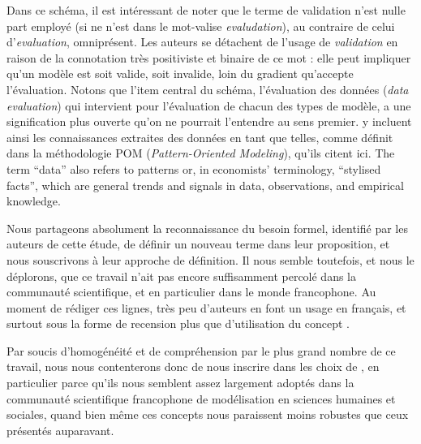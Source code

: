 Dans ce schéma, il est intéressant de noter que le terme de \og validation\fg{} n'est nulle part employé (si ne n'est dans le mot-valise \textit{evaludation}), au contraire de celui d'\og \textit{evaluation}\fg{}, omniprésent.
Les auteurs se détachent de l'usage de \og \textit{validation}\fg{} en raison de la connotation très positiviste et \og binaire\fg{} de ce mot : elle peut impliquer qu'un modèle est soit valide, soit invalide, loin du gradient qu'accepte l'évaluation.
Notons que l'item central du schéma, l'évaluation des données (\textit{data evaluation}) qui intervient pour l'évaluation de chacun des types de modèle, a une signification plus ouverte qu'on ne pourrait l'entendre au sens premier.
\textcite[121]{augusiak_merging_2014} y incluent ainsi les connaissances extraites des données en tant que telles, comme définit dans la méthodologie \og POM\fg{} (\textit{Pattern-Oriented Modeling}), qu'ils citent ici.
\og The term ``data'' also refers
to patterns \autocite{grimm_pattern-oriented_2012} or, in economists' terminology, ``stylised facts'', which are general trends and signals in data,
observations, and empirical knowledge.\fg{}

Nous partageons absolument la reconnaissance du besoin formel, identifié par les auteurs de cette étude, de définir un nouveau terme dans leur proposition, et nous souscrivons à leur approche de définition.
Il nous semble toutefois, et nous le déplorons, que ce travail n'ait pas encore suffisamment percolé dans la communauté scientifique, et en particulier dans le monde francophone.
Au moment de rédiger ces lignes, très peu d'auteurs en font un usage en français, et surtout sous la forme de recension plus que d'utilisation du concept \autocite[par exemple][89,436]{rey-coyrehourcq_plateforme_2015}.

Par soucis d'homogénéité et de compréhension par le plus grand nombre de ce travail, nous nous contenterons donc de nous inscrire dans les choix de \textcite[voir \cref{enc:lexique-eval-amblard}]{amblard_evaluation_2006}, en particulier parce qu'ils nous semblent assez largement adoptés dans la communauté scientifique francophone de modélisation en sciences humaines et sociales, quand bien même ces concepts nous paraissent moins robustes que ceux présentés auparavant.

